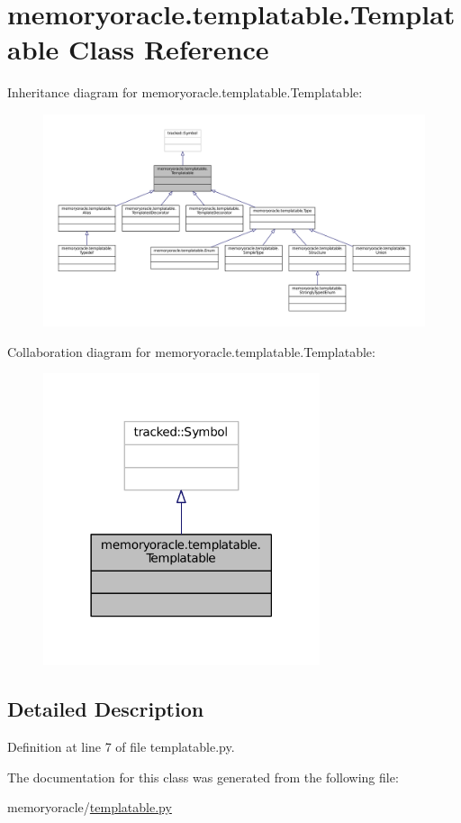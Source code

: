 \hypertarget{classmemoryoracle_1_1templatable_1_1Templatable}{}\section{memoryoracle.\+templatable.\+Templatable Class Reference}
\label{classmemoryoracle_1_1templatable_1_1Templatable}


Inheritance diagram for memoryoracle.\+templatable.\+Templatable\+:\nopagebreak
\begin{figure}[H]
\begin{center}
\leavevmode
\includegraphics[width=350pt]{classmemoryoracle_1_1templatable_1_1Templatable__inherit__graph}
\end{center}
\end{figure}


Collaboration diagram for memoryoracle.\+templatable.\+Templatable\+:\nopagebreak
\begin{figure}[H]
\begin{center}
\leavevmode
\includegraphics[width=230pt]{classmemoryoracle_1_1templatable_1_1Templatable__coll__graph}
\end{center}
\end{figure}


\subsection{Detailed Description}


Definition at line 7 of file templatable.\+py.



The documentation for this class was generated from the following file\+:\begin{DoxyCompactItemize}
\item 
memoryoracle/\hyperlink{templatable_8py}{templatable.\+py}\end{DoxyCompactItemize}
